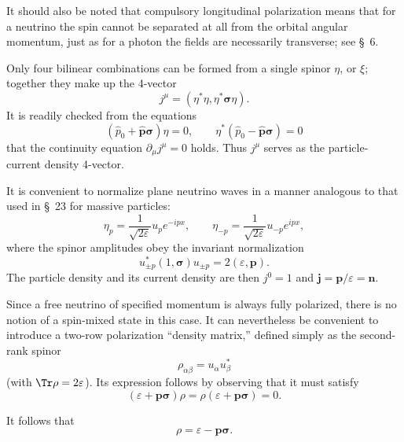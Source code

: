It should also be noted that compulsory longitudinal polarization means that for a neutrino the spin cannot be separated at all from the orbital angular momentum, just as for a photon the fields are necessarily transverse; see \S~6.

Only four bilinear combinations can be formed from a single spinor $\eta$, or $\xi$; together they make up the 4-vector
\begin{equation}
j^\mu=(\eta^*\eta,\eta^*\boldsymbol\sigma\eta).
\tag{30.9}
\end{equation}
It is readily checked from the equations
\[
(\widehat p_0+\widehat{\mathbf p}\boldsymbol\sigma)\eta=0,
\qquad
\eta^*(\widehat p_0-\widehat{\mathbf p}\boldsymbol\sigma)=0
\]
that the continuity equation $\partial_\mu j^\mu=0$ holds. Thus $j^\mu$ serves as the particle-current density 4-vector.

It is convenient to normalize plane neutrino waves in a manner analogous to that used in \S~23 for massive particles:
\begin{equation}
\eta_p=\frac{1}{\sqrt{2\varepsilon}}u_p e^{-ipx},
\qquad
\eta_{-p}=\frac{1}{\sqrt{2\varepsilon}}u_{-p}e^{ipx},
\tag{30.10}
\end{equation}
where the spinor amplitudes obey the invariant normalization
\begin{equation}
u_{\pm p}^*(1,\boldsymbol\sigma)u_{\pm p}=2(\varepsilon,\mathbf p).
\tag{30.11}
\end{equation}
The particle density and its current density are then $j^0=1$ and $\mathbf j=\mathbf p/\varepsilon=\mathbf n$.

Since a free neutrino of specified momentum is always fully polarized, there is no notion of a spin-mixed state in this case. It can nevertheless be convenient to introduce a two-row polarization ``density matrix,'' defined simply as the second-rank spinor
\begin{equation}
\rho_{\dot\alpha\beta}=u_{\dot\alpha}u_\beta^*
\tag{30.12}
\end{equation}
(with $\Tr\rho=2\varepsilon$). Its expression follows by observing that it must satisfy
\[
(\varepsilon+\mathbf p\boldsymbol\sigma)\rho
=\rho(\varepsilon+\mathbf p\boldsymbol\sigma)=0.
\]

It follows that
\begin{equation}
\rho=\varepsilon-\mathbf p\boldsymbol\sigma.
\tag{30.13}
\end{equation}

